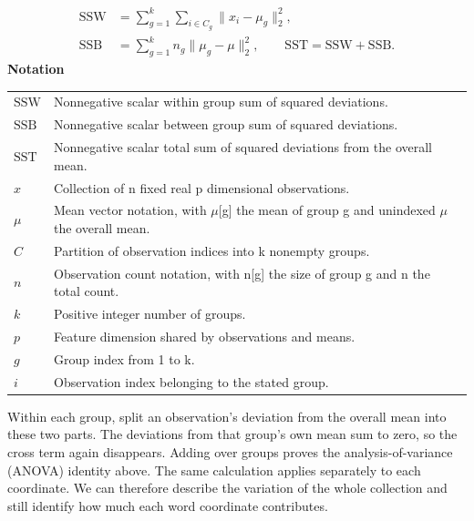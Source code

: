 \documentclass[10pt,letterpaper]{article}
\newcommand{\notlabel}{\noindent\textbf{Notation}\par\nobreak\vspace{4pt}}
\begin{document}
\par\noindent\begin{minipage}{\linewidth}
\begin{equation}\label{eq:anova}
\begin{aligned}\mathrm{SSW}&=\sum_{g=1}^{k}\sum_{i\in C_g}\lVert x_i-\mu_g\rVert_2^2,\\\mathrm{SSB}&=\sum_{g=1}^{k}n_g\lVert\mu_g-\mu\rVert_2^2,\qquad\mathrm{SST}=\mathrm{SSW}+\mathrm{SSB}.\end{aligned}
\end{equation}
\notlabel
{\fontsize{8.5}{10.5}\selectfont\setlength{\tabcolsep}{0pt}\renewcommand{\arraystretch}{1.12}
\begin{tabularx}{\linewidth}{@{}p{.14\linewidth}X@{}}
$\mathrm{SSW}$ & Nonnegative scalar within group sum of squared deviations.\\
$\mathrm{SSB}$ & Nonnegative scalar between group sum of squared deviations.\\
$\mathrm{SST}$ & Nonnegative scalar total sum of squared deviations from the overall mean.\\
$x$ & Collection of n fixed real p dimensional observations.\\
$\mu$ & Mean vector notation, with \ensuremath{\mu}[g] the mean of group g and unindexed \ensuremath{\mu} the overall mean.\\
$C$ & Partition of observation indices into k nonempty groups.\\
$n$ & Observation count notation, with n[g] the size of group g and n the total count.\\
$k$ & Positive integer number of groups.\\
$p$ & Feature dimension shared by observations and means.\\
$g$ & Group index from 1 to k.\\
$i$ & Observation index belonging to the stated group.\\
\end{tabularx}}
\par\vspace{2pt}
\end{minipage}\par
Within each group, split an observation's deviation from the overall mean into these two parts. The deviations from that group's own mean sum to zero, so the cross term again disappears. Adding over groups proves the analysis-of-variance (ANOVA) identity above. The same calculation applies separately to each coordinate. We can therefore describe the variation of the whole collection and still identify how much each word coordinate contributes.\par
\end{document}
